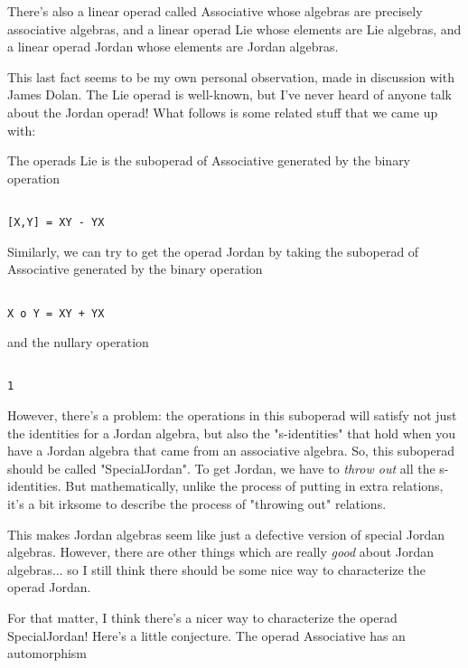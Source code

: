 There's also a linear operad called Associative whose algebras are 
precisely associative algebras, and a linear operad Lie whose elements 
are Lie algebras, and a linear operad Jordan whose elements are Jordan 
algebras.  

This last fact seems to be my own personal observation, made in
discussion with James Dolan.  The Lie operad is well-known, but I've
never heard of anyone talk about the Jordan operad!  What follows is
some related stuff that we came up with:

The operads Lie is the suboperad of Associative generated by the
binary operation


\begin{verbatim}

[X,Y] = XY - YX 
\end{verbatim}
    
Similarly, we can try to get the operad Jordan by taking the suboperad 
of Associative generated by the binary operation


\begin{verbatim}

X o Y = XY + YX
\end{verbatim}
    
and the nullary operation 


\begin{verbatim}

1
\end{verbatim}
    
However, there's a problem: the operations in this suboperad will
satisfy not just the identities for a Jordan algebra, but also the
"s-identities" that hold when you have a Jordan algebra that came 
from an associative algebra.  So, this suboperad should be called
"SpecialJordan".  To get Jordan, we have to \emph{throw out} 
all the
s-identities.  But mathematically, unlike the process of putting
in extra relations, it's a bit irksome to describe the process of
"throwing out" relations. 

This makes Jordan algebras seem like just a defective version of special
Jordan algebras.  However, there are other things which are really
\emph{good} about Jordan algebras... so I still think there should be some
nice way to characterize the operad Jordan.

For that matter, I think there's a nicer way to characterize the operad
SpecialJordan!  Here's a little conjecture.  The operad Associative has
an automorphism


$$

